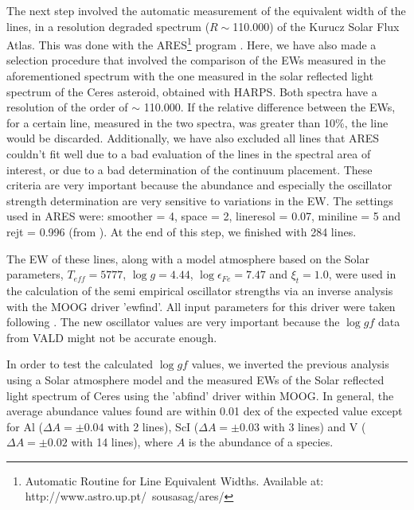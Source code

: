 \documentclass[oldversion]{aa}
\begin{document}
The next step involved the automatic measurement of the equivalent width of the lines, in a resolution degraded spectrum ($R\sim$110.000) of the Kurucz Solar Flux Atlas. This was done with the ARES\footnote{Automatic Routine for Line Equivalent Widths. Available at: http://www.astro.up.pt/~sousasag/ares/} program \citep{Sousa-2007}. Here, we have also made a selection procedure that involved the comparison of the EWs measured in the aforementioned spectrum with the one measured in the solar reflected light spectrum of the Ceres asteroid, obtained with HARPS. Both spectra have a resolution of the order of $\sim$ 110.000. If the relative difference between the EWs, for a certain line, measured in the two spectra, was greater than 10\%, the line would be discarded. Additionally, we have also excluded all lines that ARES couldn't fit well due to a bad evaluation of the lines in the spectral area of interest, or due to a bad determination of the continuum placement. These criteria are very important because the abundance and especially the oscillator strength determination %
are very sensitive to variations in the EW. The settings used in ARES were: smoother = 4, space = 2, lineresol = 0.07, miniline = 5 and rejt = 0.996 (from \citeauthor {Sousa-2008} \citeyear {Sousa-2008}). At the end of this step, we finished with 284 lines.

The EW of these lines, along with a model atmosphere based on the Solar parameters, $T_{eff}=5777$, $\log g=4.44$, $\log\epsilon_{Fe}=7.47$ and $\xi_t=1.0$, were used in the calculation of the semi empirical oscillator strengths via an inverse analysis with the MOOG driver 'ewfind'. All input parameters for this driver were taken following \citet{Santos-2004b}. The new oscillator values are very important because the $\log gf$ data from VALD might not be accurate enough. 

In order to test the calculated $\log gf$ values, we inverted the previous analysis using a Solar atmosphere model and the measured EWs of the Solar reflected light spectrum of Ceres using the 'abfind' driver within MOOG. In general, the average abundance values found are within 0.01 dex of the expected value except for Al ($\Delta A=\pm0.04$ with 2 lines), ScI ($\Delta A=\pm0.03$ with 3 lines) and V ($\Delta A=\pm0.02$ with 14 lines), where $A$ is the abundance of a species. %
\end{document}
